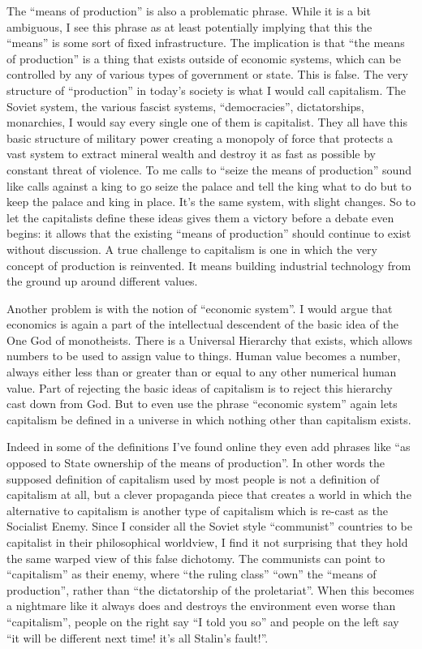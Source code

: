 The ``means of production'' is also a problematic phrase. While it is a
bit ambiguous, I see this phrase as at least potentially implying that
this the ``means'' is some sort of fixed infrastructure. The implication
is that ``the means of production'' is a thing that exists outside of
economic systems, which can be controlled by any of various types of
government or state. This is false. The very structure of ``production''
in today's society is what I would call capitalism. The Soviet system,
the various fascist systems, ``democracies'', dictatorships, monarchies,
I would say every single one of them is capitalist. They all have this
basic structure of military power creating a monopoly of force that
protects a vast system to extract mineral wealth and destroy it as fast
as possible by constant threat of violence. To me calls to ``seize the
means of production'' sound like calls against a king to go seize the
palace and tell the king what to do but to keep the palace and king in
place. It's the same system, with slight changes. So to let the
capitalists define these ideas gives them a victory before a debate even
begins: it allows that the existing ``means of production'' should
continue to exist without discussion. A true challenge to capitalism is
one in which the very concept of production is reinvented. It means
building industrial technology from the ground up around different
values.

Another problem is with the notion of ``economic system''. I would argue
that economics is again a part of the intellectual descendent of the
basic idea of the One God of monotheists. There is a Universal Hierarchy
that exists, which allows numbers to be used to assign value to things.
Human value becomes a number, always either less than or greater than or
equal to any other numerical human value. Part of rejecting the basic
ideas of capitalism is to reject this hierarchy cast down from God. But
to even use the phrase ``economic system'' again lets capitalism be
defined in a universe in which nothing other than capitalism exists.

Indeed in some of the definitions I've found online they even add
phrases like ``as opposed to State ownership of the means of
production''. In other words the supposed definition of capitalism used
by most people is not a definition of capitalism at all, but a clever
propaganda piece that creates a world in which the alternative to
capitalism is another type of capitalism which is re-cast as the
Socialist Enemy. Since I consider all the Soviet style ``communist''
countries to be capitalist in their philosophical worldview, I find it
not surprising that they hold the same warped view of this false
dichotomy. The communists can point to ``capitalism'' as their enemy,
where ``the ruling class'' ``own'' the ``means of production'', rather
than ``the dictatorship of the proletariat''. When this becomes a
nightmare like it always does and destroys the environment even worse
than ``capitalism'', people on the right say ``I told you so'' and
people on the left say ``it will be different next time! it's all
Stalin's fault!''.

